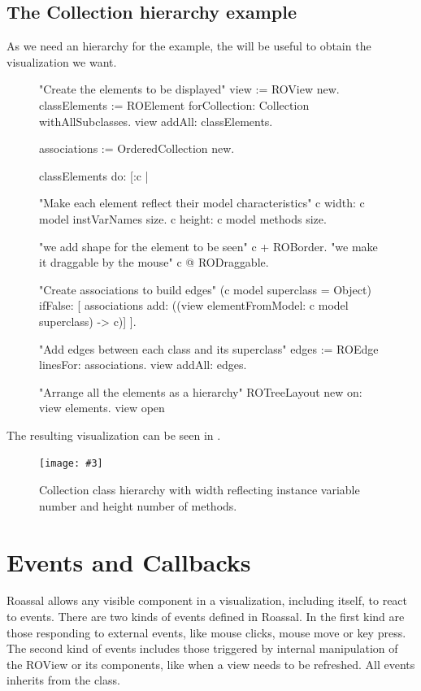 \documentclass[a4paper,10pt,twoside]{book}
\newcommand{\fig}[4]{
		\begin{figure}[#1]
			\centering
			\texttt{[image: \#3]}
			\caption{\label{fig:#3}#4}
		\end{figure}}
\begin{document}
\subsection*{The Collection hierarchy example}

As we need an hierarchy for the  example, the  will be useful to obtain the visualization we want.

\begin{figure}[H]
\begin{code}{}

"Create the elements to be displayed"
view := ROView new.
classElements := ROElement forCollection: Collection withAllSubclasses.
view addAll: classElements.

associations := OrderedCollection new.

classElements do: [:c | 

	"Make each element reflect their model characteristics"
	c width: c model instVarNames size.
	c height: c model methods size.
	
	"we add shape for the element to be seen"
	c + ROBorder. 
	"we make it draggable by the mouse"
	c @ RODraggable.
	
	"Create associations to build edges"
	(c model superclass = Object)
		ifFalse: [ associations add: ((view elementFromModel: c model superclass) -> c)]	
	 ].
	 
"Add edges between each class and its superclass"
edges := ROEdge linesFor: associations.
view addAll: edges.

"Arrange all the elements as a hierarchy"
ROTreeLayout new on: view elements.
view open
\end{code}
\end{figure}

The resulting visualization can be seen in .

\fig{H}{0.4}{collectionHierarchy}{Collection class hierarchy with width reflecting instance variable number and height number of methods.}


\section{Events and Callbacks}

Roassal allows any visible component in a visualization, including itself, to react to events. There are two kinds of events defined in Roassal. In the first kind are those responding to external events, like mouse clicks, mouse move or key press. The second kind of events includes those triggered by internal manipulation of the ROView or its components, like when a view needs to be refreshed. All events inherits from the  class.
\end{document}
